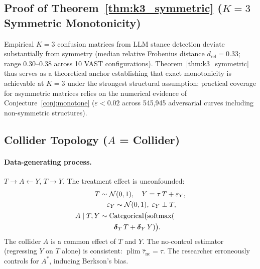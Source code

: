 \subsection{Proof of Theorem~\ref{thm:k3_symmetric} ($K{=}3$ Symmetric Monotonicity)}
\label{app:k3_symmetric_proof}



\begin{remark}
\label{rem:symmetry}
Empirical $K{=}3$ confusion matrices from LLM stance detection deviate substantially from symmetry (median relative Frobenius distance $d_{\mathrm{rel}}{=}0.33$; range 0.30--0.38 across 10 VAST configurations). Theorem~\ref{thm:k3_symmetric} thus serves as a theoretical anchor establishing that exact monotonicity is achievable at $K{=}3$ under the strongest structural assumption; practical coverage for asymmetric matrices relies on the numerical evidence of Conjecture~\ref{conj:monotone} ($\varepsilon < 0.02$ across 545{,}945 adversarial curves including non-symmetric structures).
\end{remark}

\subsection{Collider Topology ($A$ = Collider)}
\label{app:collider}

\paragraph{Data-generating process.}
$T\to A\leftarrow Y$, $T\to Y$.
The treatment effect is unconfounded:
\begin{align*}
  T &\sim \mathcal{N}(0,1),\quad
  Y = \tau\,T + \varepsilon_Y,\\
  &\quad \varepsilon_Y\sim\mathcal{N}(0,1),\;\varepsilon_Y\perp T,\notag\\
  A\mid T,Y &\sim \operatorname{Categorical}\bigl(\operatorname{softmax}(\\
  &\qquad\boldsymbol{\delta}_T\,T + \boldsymbol{\delta}_Y\,Y)\bigr).
\end{align*}
The collider $A$ is a common effect of $T$ and $Y$.
The no-control estimator (regressing $Y$ on $T$ alone) is consistent: $\operatorname{plim}\hat\tau_{\mathrm{nc}}=\tau$.
The researcher erroneously controls for $A^*$, inducing Berkson's bias.

